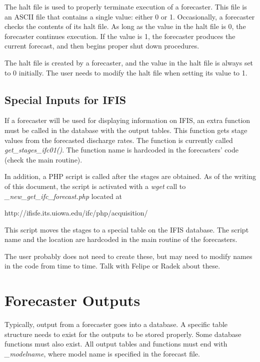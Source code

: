 \documentclass[12pt]{article}
\newenvironment{codeindent}
{\begin{list}{}
        {\setlength{\leftmargin}{.1in}}
        \item[]
}
{\end{list}}
\begin{document}
The halt file is used to properly terminate execution of a forecaster. This file is an ASCII file that contains a single value: either 0 or 1. Occasionally, a forecaster checks the contents of its halt file. As long as the value in the halt file is 0, the forecaster continues execution. If the value is 1, the forecaster produces the current forecast, and then begins proper shut down procedures.

The halt file is created by a forecaster, and the value in the halt file is always set to 0 initially. The user needs to modify the halt file when setting its value to 1.

\subsection{Special Inputs for IFIS} \label{sec: database functions for IFIS}

If a forecaster will be used for displaying information on IFIS, an extra function must be called in the database with the output tables. This function gets stage values from the forecasted discharge rates. The function is currently called \emph{get\_stages\_ifc01()}. The function name is hardcoded in the forecasters' code (check the main routine).

In addition, a PHP script is called after the stages are obtained. As of the writing of this document, the script is activated with a \emph{wget} call to \emph{\_new\_get\_ifc\_forecast.php} located at
\begin{codeindent}
http://ifisfe.its.uiowa.edu/ifc/php/acquisition/
\end{codeindent}
This script moves the stages to a special table on the IFIS database. The script name and the location are hardcoded in the main routine of the forecasters.

The user probably does not need to create these, but may need to modify names in the code from time to time. Talk with Felipe or Radek about these.


\section{Forecaster Outputs} \label{sec: forecaster outputs}

Typically, output from a forecaster goes into a database. A specific table structure needs to exist for the outputs to be stored properly. Some database functions must also exist. All output tables and functions must end with \mbox{\emph{\_modelname}}, where model name is specified in the forecast file.
\end{document}
